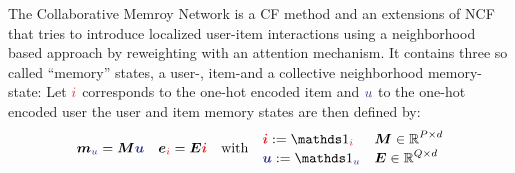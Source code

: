 The Collaborative Memroy Network is a CF method and an extensions of NCF \cite{he2017neural} that tries to introduce 
localized user-item interactions using a neighborhood based approach by reweighting with an attention mechanism.
It contains three so called ``memory'' states, a user-, item-and a collective neighborhood memory-state:
Let $\idxi$ corresponds to the one-hot encoded item and $\idxu$ to the one-hot encoded user the user and item memory states are then defined by:
\begin{align*}
  \vec{m}_{\idxu}=\vec{M}\vec{\idxu}&&\vec{e}_{\idxi}=\vec{E}\vec{\idxi}&&\text{with}&&
   \begin{aligned}
    &\vec{\idxi}:=\unitVector_{\idxi}&&\vec{M}\in\R^{P\times d}\\[-1\jot]
    &\vec{\idxu}:=\unitVector_{\idxu}&&\vec{E}\in\R^{Q\times d}
   \end{aligned}                                                                         
\end{align*}
